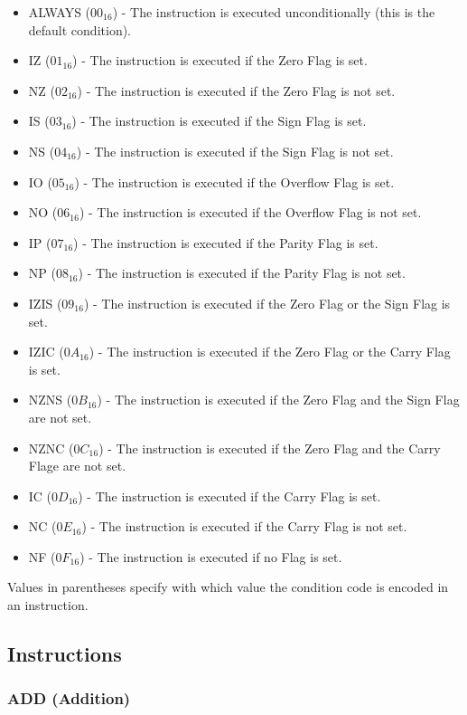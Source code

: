 \begin{itemize}
	\item ALWAYS ($00_{16}$) - The instruction is executed unconditionally (this is the default condition).
	\item IZ ($01_{16}$) - The instruction is executed if the Zero Flag is set.
	\item NZ ($02_{16}$) - The instruction is executed if the Zero Flag is not set.
	\item IS ($03_{16}$) - The instruction is executed if the Sign Flag is set.
	\item NS ($04_{16}$) - The instruction is executed if the Sign Flag is not set.
	\item IO ($05_{16}$) - The instruction is executed if the Overflow Flag is set.
	\item NO ($06_{16}$) - The instruction is executed if the Overflow Flag is not set.
	\item IP ($07_{16}$) - The instruction is executed if the Parity Flag is set.
	\item NP ($08_{16}$) - The instruction is executed if the Parity Flag is not set.
	\item IZIS ($09_{16}$) - The instruction is executed if the Zero Flag or the Sign Flag is set.
	\item IZIC ($0A_{16}$) - The instruction is executed if the Zero Flag or the Carry Flag is set.
	\item NZNS ($0B_{16}$) - The instruction is executed if the Zero Flag and the Sign Flag are not set.
	\item NZNC ($0C_{16}$) - The instruction is executed if the Zero Flag and the Carry Flage are not set.
	\item IC ($0D_{16}$) - The instruction is executed if the Carry Flag is set.
	\item NC ($0E_{16}$) - The instruction is executed if the Carry Flag is not set.
	\item NF ($0F_{16}$) - The instruction is executed if no Flag is set.
\end{itemize}

Values in parentheses specify with which value the condition code is encoded in an instruction. 

\subsection{Instructions}

\subsubsection{ADD (Addition)}

